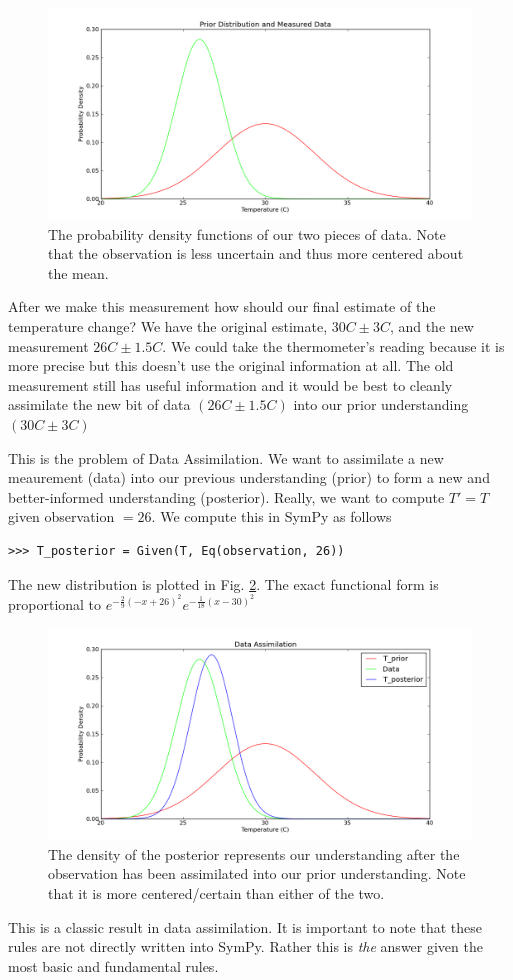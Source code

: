 \begin{figure}[ht]
\vspace{-0pt}
\centering
\includegraphics[width=.7\textwidth]{images/data.png}
\vspace{-0pt}
\caption{The probability density functions of our two pieces of data. Note that the observation is less uncertain and thus more centered about the mean.}
\label{fig:DA_data}
\vspace{00pt}
\end{figure}

After we make this measurement how should our final estimate of the temperature change? We have the original estimate, $30C \pm 3C$, and the new measurement $26C \pm 1.5C$. We could take the thermometer’s reading because it is more precise but this doesn’t use the original information at all. The old measurement still has useful information and it would be best to cleanly assimilate the new bit of data $(26C \pm 1.5C)$ into our prior understanding $(30C \pm 3C)$

This is the problem of Data Assimilation. We want to assimilate a new meaurement (data) into our previous understanding (prior) to form a new and better-informed understanding (posterior). Really, we want to compute $T' = T$ given observation $= 26$. We compute this in SymPy as follows

\begin{lstlisting}
>>> T_posterior = Given(T, Eq(observation, 26))
\end{lstlisting}

The new distribution is plotted in Fig. \ref{fig:DA_posterior}. The exact functional form is proportional to $e^{-\frac{2}{9} \left(-x + 26\right)^{2}} e^{-\frac{1}{18} \left(x-30\right)^{2}}$ 

\begin{figure}[ht]
\vspace{-0pt}
\centering
\includegraphics[width=.7\textwidth]{images/posterior.png}
\vspace{-0pt}
\caption{The density of the posterior represents our understanding after the observation has been assimilated into our prior understanding. Note that it is more centered/certain than either of the two. }
\label{fig:DA_posterior}
\vspace{00pt}
\end{figure}

This is a classic result in data assimilation. It is important to note that these rules are not directly written into SymPy. Rather this is \textit{the} answer given the most basic and fundamental rules. 
